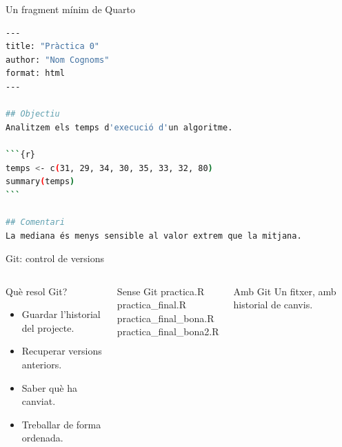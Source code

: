 \documentclass[10pt,aspectratio=169]{beamer}
\begin{document}
\begin{frame}[fragile]{Un fragment mínim de Quarto}
\begin{lstlisting}[language=bash]
---
title: "Pràctica 0"
author: "Nom Cognoms"
format: html
---

## Objectiu
Analitzem els temps d'execució d'un algoritme.

```{r}
temps <- c(31, 29, 34, 30, 35, 33, 32, 80)
summary(temps)
```

## Comentari
La mediana és menys sensible al valor extrem que la mitjana.
\end{lstlisting}
\end{frame}

\begin{frame}{Git: control de versions}
\begin{columns}[T]
\begin{block}{Què resol Git?}
\begin{itemize}
  \item Guardar l'historial del projecte.
  \item Recuperar versions anteriors.
  \item Saber què ha canviat.
  \item Treballar de forma ordenada.
\end{itemize}
\end{block}

\begin{alertblock}{Sense Git}
\ttfamily\small
practica.R\\
practica\_final.R\\
practica\_final\_bona.R\\
practica\_final\_bona2.R
\end{alertblock}

\begin{block}{Amb Git}
Un fitxer, amb historial de canvis.
\end{block}
\end{columns}
\end{frame}
\end{document}
